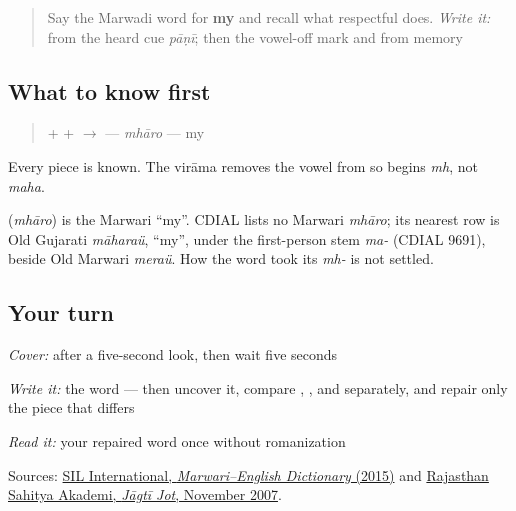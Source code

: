 \label{lesson:MW-C05-mharo}



\begin{quote}
Say the Marwadi word for \textbf{my} and recall what respectful \textbf{} does. \emph{Write it:} \textbf{} from the heard cue \emph{pāṇī}; then the vowel-off mark and \textbf{} from memory
\end{quote}

\subsection*{What to know first}
\begin{quote}
\textbf{} + \textbf{} + \textbf{} $\to$ \textbf{} — \emph{mhāro} — my
\end{quote}

Every piece is known. The virāma removes the vowel from \textbf{} so \textbf{} begins \emph{mh}, not \emph{maha}.

\begin{cousinweb}
\textbf{} (\emph{mhāro}) is the Marwari \textquotedblleft{}my\textquotedblright{}. CDIAL lists no Marwari \emph{mhāro}; its nearest row is Old Gujarati \emph{māharaü}, \textquotedblleft{}my\textquotedblright{}, under the first-person stem \emph{ma-} (CDIAL 9691), beside Old Marwari \emph{meraü}. How the word took its \emph{mh-} is not settled.
\end{cousinweb}

\subsection*{Your turn}
\emph{Cover:} \textbf{} after a five-second look, then wait five seconds

\emph{Write it:} the word — then uncover it, compare \textbf{}, \textbf{}, and \textbf{} separately, and repair only the piece that differs

\begin{tcolorbox}[breakable,colback=teal!4,colframe=teal!35!black,title={Before you move on}]
\emph{Read it:} your repaired word once without romanization

Sources: \href{https://nepal.sil.org/resources/archives/63768}{SIL International, \emph{Marwari–English Dictionary} (2015)} and \href{https://rsad.artandculture.rajasthan.gov.in/content/dam/doitassets/art-and-culture/Rajasthani-Bhasha-Sahitya-Avm-Sanskriti-Academy-Bikaner/pdf/JJ\_All\_Pdf/JJ\_36\_08\_08\_November\_to\_November\_2007.pdf}{Rajasthan Sahitya Akademi, \emph{Jāgtī Jot}, November 2007}.
\end{tcolorbox}
